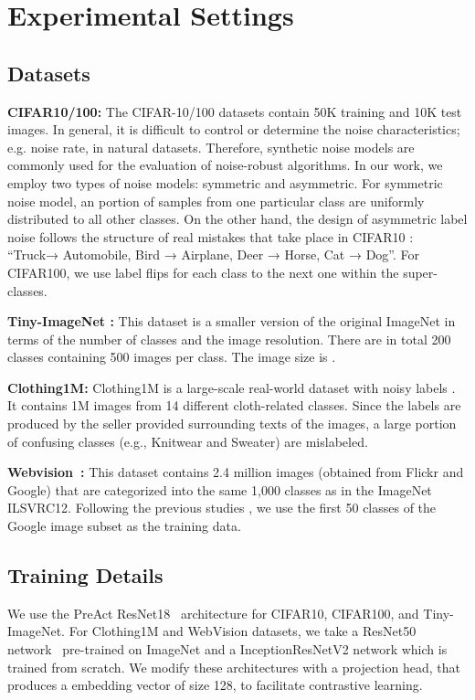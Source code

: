\documentclass[10pt,twocolumn,letterpaper]{article}
\begin{document}
\section{Experimental Settings}
\subsection{Datasets}
\textbf{CIFAR10/100:} The CIFAR-10/100 datasets \cite{krizhevsky2009learning} contain 50K training and 10K test images.
In general, it is difficult to control or determine the noise characteristics; e.g. noise rate, in natural datasets. Therefore, synthetic noise models are commonly used for the evaluation of noise-robust algorithms. In our work, we employ two types of noise models: symmetric and asymmetric. For symmetric noise model, an  portion of samples from one particular class are uniformly distributed to all other classes.
On the other hand, the design of asymmetric label noise follows the structure of real mistakes that take place in CIFAR10 \cite{li2019learning}: “Truck→ Automobile, Bird → Airplane, Deer → Horse, Cat → Dog”.  For CIFAR100, we use label flips for each class to the next one within the super-classes.  



\textbf{Tiny-ImageNet \cite{le2015tiny}:} This dataset is a smaller version of the original ImageNet in terms of the number of classes and the image resolution. There are in total 200 classes containing 500 images per class. The image size is . 


\textbf{Clothing1M:} Clothing1M is a large-scale
real-world dataset with noisy labels \cite{xiao2015learning}. It contains 1M images from 14 different cloth-related classes.
Since the labels are produced by the seller provided surrounding texts of the images, a large portion of confusing classes (e.g., Knitwear and Sweater) are mislabeled. 


\textbf{Webvision~\cite{li2017webvision}:} This dataset contains 2.4 million images (obtained from Flickr and Google)
that are categorized into the same 1,000 classes as in the ImageNet ILSVRC12. 
Following the previous studies \cite{li2020dividemix, nishi2021augmentation}, we use the first 50 classes of the Google image subset as the training data. 

\subsection{Training Details}
We use the PreAct ResNet18~\cite{he2016deep} architecture for CIFAR10, CIFAR100, and Tiny-ImageNet. For Clothing1M and WebVision datasets, we take a ResNet50 network~\cite{he2016deep} pre-trained on ImageNet and a InceptionResNetV2 network \cite{szegedy2017inception} which is trained from scratch. We modify these architectures with a projection head, that produces a embedding vector of size 128,  to facilitate contrastive learning.
\end{document}
